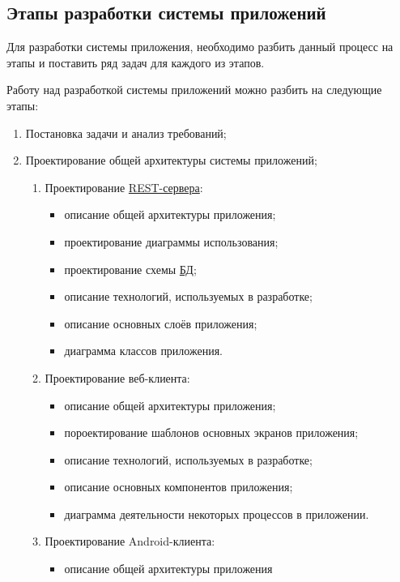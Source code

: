 \subsection{Этапы разработки системы приложений}\label{subsec:2-dev-stages}\indent

Для разработки системы приложения, необходимо разбить данный процесс на этапы и поставить ряд задач для каждого из этапов.

Работу над разработкой системы приложений можно разбить на следующие этапы:

\begin{enumerate}
    \item Постановка задачи и анализ требований;
    \item Проектирование общей архитектуры системы приложений;
    \begin{enumerate}
        \item Проектирование \hyperlink{gloss:rest}{REST-сервера}:
        \begin{itemize}
            \item описание общей архитектуры приложения;
            \item проектирование диаграммы использования;
            \item проектирование схемы \hyperlink{gloss:db}{БД};
            \item описание технологий, используемых в разработке;
            \item описание основных слоёв приложения;
            \item диаграмма классов приложения.
        \end{itemize}
        \item Проектирование веб-клиента:
        \begin{itemize}
            \item описание общей архитектуры приложения;
            \item пороектирование шаблонов основных экранов приложения;
            \item описание технологий, используемых в разработке;
            \item описание основных компонентов приложения;
            \item диаграмма деятельности некоторых процессов в приложении.
        \end{itemize}
        \item Проектирование Android-клиента:
        \begin{itemize}
            \item описание общей архитектуры приложения

\end{itemize}
\end{enumerate}
\end{enumerate}
